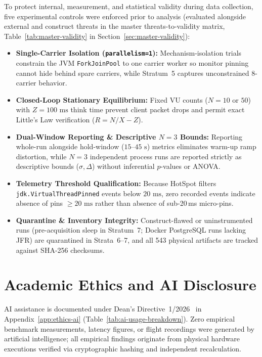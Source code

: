 To protect internal, measurement, and statistical validity during data collection, five experimental controls were enforced prior to analysis (evaluated alongside external and construct threats in the master threats-to-validity matrix, Table~\ref{tab:master-validity} in Section~\ref{sec:master-validity}):
\begin{itemize}
  \item \textbf{Single-Carrier Isolation (\texttt{parallelism=1}):} Mechanism-isolation trials constrain the JVM \texttt{ForkJoinPool} to one carrier worker so monitor pinning cannot hide behind spare carriers, while Stratum~5 captures unconstrained 8-carrier behavior.
  \item \textbf{Closed-Loop Stationary Equilibrium:} Fixed VU counts ($N=10$ or $50$) with $Z=100\text{ ms}$ think time prevent client packet drops and permit exact Little's Law verification ($R = N/X - Z$).
  \item \textbf{Dual-Window Reporting \& Descriptive $N=3$ Bounds:} Reporting whole-run alongside hold-window ($15\text{--}45\text{ s}$) metrics eliminates warm-up ramp distortion, while $N=3$ independent process runs are reported strictly as descriptive bounds ($\sigma, \Delta$) without inferential $p$-values or ANOVA.
  \item \textbf{Telemetry Threshold Qualification:} Because HotSpot  filters \texttt{jdk.VirtualThreadPinned} events below $20\text{ ms}$, zero recorded events indicate absence of pins $\ge 20\text{ ms}$ rather than absence of sub-20\,ms micro-pins.
  \item \textbf{Quarantine \& Inventory Integrity:} Construct-flawed or uninstrumented runs (pre-acquisition sleep in Stratum~7; Docker PostgreSQL runs lacking JFR) are quarantined in Strata~6--7, and all 543 physical artifacts are tracked against SHA-256 checksums.
\end{itemize}

\section{Academic Ethics and AI Disclosure}
\label{sec:ethics-ai-methodology}

AI assistance is documented under Dean's Directive~1/2026~\cite{elteikAiPolicy} in Appendix~\ref{app:ethics-ai} (Table~\ref{tab:ai-usage-breakdown}). Zero empirical benchmark measurements, latency figures, or flight recordings were generated by artificial intelligence; all empirical findings originate from physical hardware executions verified via cryptographic hashing and independent recalculation.
